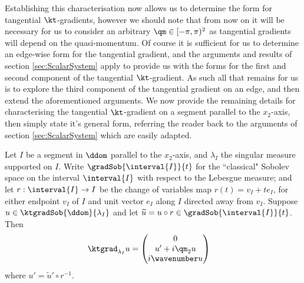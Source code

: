 Establishing this characterisation now allows us to determine the form for tangential $\kt$-gradients, however we should note that from now on it will be necessary for us to consider an arbitrary $\qm\in[-\pi,\pi)^2$ as tangential gradients will depend on the quasi-momentum.
Of course it is sufficient for us to determine an edge-wise form for the tangential gradient, and the arguments and results of section \ref{sec:ScalarSystem} apply to provide us with the forms for the first and second component of the tangential $\kt$-gradient.
As such all that remains for us is to explore the third component of the tangential gradient on an edge, and then extend the aforementioned arguments.
We now provide the remaining details for characterising the tangential $\kt$-gradient on a segment parallel to the $x_2$-axis, then simply state it's general form, referring the reader back to the arguments of section \ref{sec:ScalarSystem} which are easily adapted.
\begin{prop} \label{prop:ktTangentialGradientSegment}
	Let $I$ be a segment in $\ddom$ parallel to the $x_2$-axis, and $\lambda_I$ the singular measure supported on $I$.
	Write $\gradSob{\interval{I}}{t}$ for the ``classical" Sobolev space on the interval $\interval{I}$ with respect to the Lebesgue measure; and let $r:\interval{I}\rightarrow I$ be the change of variables map $r(t) = v_I + te_I$, for either endpoint $v_I$ of $I$ and unit vector $e_I$ along $I$ directed away from $v_I$.
	Suppose $u\in\ktgradSob{\ddom}{\lambda_I}$ and let $\widetilde{u} = u\circ r\in\gradSob{\interval{I}}{t}$.
	Then
	\begin{align*}
		\ktgrad_{\lambda_I}u &= \begin{pmatrix} 0 \\ u' + i\qm_2 u \\ i\wavenumber u\end{pmatrix}
	\end{align*}
	where $u' = \widetilde{u}'\circ r^{-1}$.
\end{prop}
